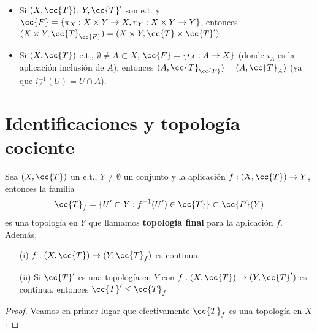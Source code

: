 \begin{ejemplo}\
    \begin{itemize}
        \item Si $(X, \cc{T})$, $Y, \cc{T}'$ son e.t. y $\cc{F}=\{\pi_X: X\times Y \to X, \pi_Y:X\times Y \to Y\}$, entonces $(X\times Y, \cc{T}_{\cc{F}}) = (X\times Y, \cc{T}\times \cc{T}')$
        \item Si $(X, \cc{T})$ e.t., $\emptyset \neq A \subset X$, $\cc{F}=\{i_A: A\to X\}$ (donde $i_A$ es la aplicación inclusión de $A$), entonces $(A, \cc{T}_{\cc{F}})=(A, \cc{T}_A)$ (ya que $i_A^{-1}(U)=U \cap A$).
    \end{itemize}
\end{ejemplo}

\section{Identificaciones y topología cociente}

\begin{teo}
    Sea $(X, \cc{T})$ un e.t., $Y\neq \emptyset$ un conjunto y la aplicación $f:(X, \cc{T})\to Y$, entonces la familia
    \begin{gather*}
        \cc{T}_f = \{U'\subset Y : f^{-1}(U')\in \cc{T}\}\subset \cc{P}(Y)
    \end{gather*}
    es una topología en $Y$ que llamamos \textbf{topología final} para la aplicación $f$. Además,
    \begin{enumerate}
        \item[(i)] $f:(X, \cc{T})\to (Y, \cc{T}_f)$ es continua.
        \item[(ii)] Si $\cc{T}'$ es una topología en $Y$ con $f:(X, \cc{T})\to (Y, \cc{T}')$ es continua, entonces $\cc{T}'\leq \cc{T}_f$
    \end{enumerate}
    \begin{proof}
        Veamos en primer lugar que efectivamente $\cc{T}_f$ es una topología en $X$:
    \end{proof}
\end{teo}
